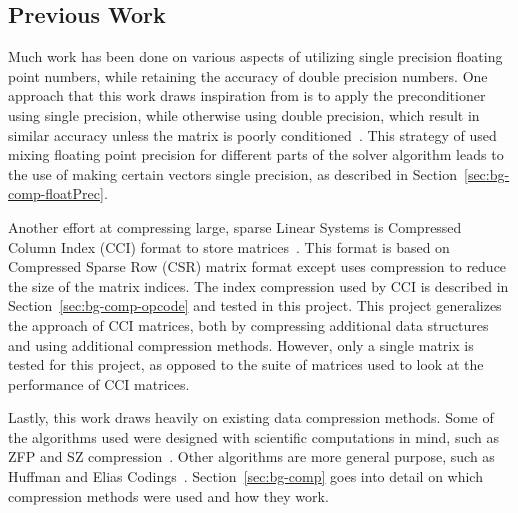 \subsection{Previous Work}
Much work has been done on various aspects of utilizing single precision floating point numbers, while retaining the accuracy of double precision numbers.
One approach that this work draws inspiration from is to apply the preconditioner using single precision, while otherwise using double precision, which result in similar accuracy unless the matrix is poorly conditioned~\cite{Buttari:2008:mixedPrec, Hogg:2010:multiplePasses}.
This strategy of used mixing floating point precision for different parts of the solver algorithm leads to the use of making certain vectors single precision, as described in Section~\ref{sec:bg-comp-floatPrec}.

Another effort at compressing large, sparse Linear Systems is Compressed Column Index (CCI) format to store matrices~\cite{Lawlor:2013:compression}.
This format is based on Compressed Sparse Row (CSR) matrix format except uses compression to reduce the size of the matrix indices.
The index compression used by CCI is described in Section~\ref{sec:bg-comp-opcode} and tested in this project.
This project generalizes the approach of CCI matrices, both by compressing additional data structures and using additional compression methods.
However, only a single matrix is tested for this project, as opposed to the suite of matrices used to look at the performance of CCI matrices.

Lastly, this work draws heavily on existing data compression methods.
Some of the algorithms used were designed with scientific computations in mind, such as ZFP and SZ compression~\cite{Lindstrom:2014:zfp,Di:2016:SZ}.
Other algorithms are more general purpose, such as Huffman and Elias Codings~\cite{Huffman:1952:coding,Elias:1975:codeword}.
Section~\ref{sec:bg-comp} goes into detail on which compression methods were used and how they work.